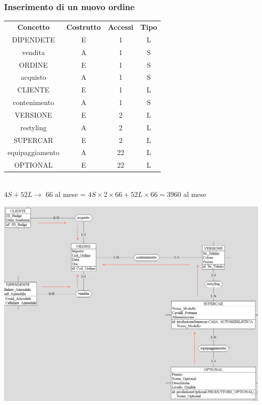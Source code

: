\documentclass[12pt]{article}
\begin{document}
\subsubsection{Inserimento di un nuovo ordine} 

\begin{table}[H]
    \centering
    \begin{tabular}{ c c c c } 
        \rowcolor{red!20!}
        \textbf{Concetto} & \textbf{Costrutto} & \textbf{Accessi} &
        \textbf{Tipo}\\ 
        DIPENDETE & E & 1 & L \\
        vendita & A & 1 & S \\
        ORDINE & E & 1 & S \\ 
        acquisto & A & 1 & S \\
        CLIENTE & E & 1 & L \\  
        contenimento & A & 1 & S \\
        VERSIONE & E & 2 & L \\
        restyling & A & 2 & L \\
        SUPERCAR & E & 2 & L \\ 
        equipaggiamento & A & 22 & L \\
        OPTIONAL & E & 22 & L \\
    \end{tabular}\\
    \( 4S + 52L \rightarrow \) 66 al mese = \( 4S \times 2 \times 66 + 52L \times
    66 = 3960\) al mese
\end{table}

\begin{center}
    \includegraphics[scale=0.53]{images/navigationSchemes/creaOrdine.png}
\end{center}
\end{document}
